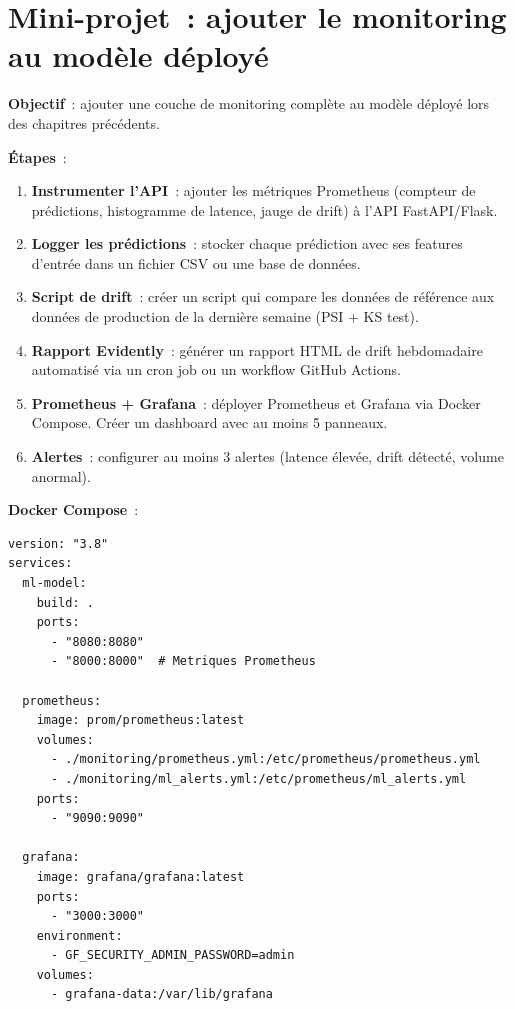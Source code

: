 \section{Mini-projet~: ajouter le monitoring au mod\`ele d\'eploy\'e}
\label{sec:monitoring-miniproject}

\begin{miniprojet}[title=\textbf{Monitoring du mod\`ele en production}]
\textbf{Objectif}~: ajouter une couche de monitoring compl\`ete au mod\`ele d\'eploy\'e lors des chapitres pr\'ec\'edents.

\textbf{\'Etapes}~:
\begin{enumerate}
    \item \textbf{Instrumenter l'API}~: ajouter les m\'etriques Prometheus (compteur de pr\'edictions, histogramme de latence, jauge de drift) \`a l'API FastAPI/Flask.
    \item \textbf{Logger les pr\'edictions}~: stocker chaque pr\'ediction avec ses features d'entr\'ee dans un fichier CSV ou une base de donn\'ees.
    \item \textbf{Script de drift}~: cr\'eer un script qui compare les donn\'ees de r\'ef\'erence aux donn\'ees de production de la derni\`ere semaine (PSI + KS test).
    \item \textbf{Rapport Evidently}~: g\'en\'erer un rapport HTML de drift hebdomadaire automatis\'e via un cron job ou un workflow GitHub Actions.
    \item \textbf{Prometheus + Grafana}~: d\'eployer Prometheus et Grafana via Docker Compose. Cr\'eer un dashboard avec au moins 5 panneaux.
    \item \textbf{Alertes}~: configurer au moins 3 alertes (latence \'elev\'ee, drift d\'etect\'e, volume anormal).
\end{enumerate}

\textbf{Docker Compose}~:
\begin{verbatim}
version: "3.8"
services:
  ml-model:
    build: .
    ports:
      - "8080:8080"
      - "8000:8000"  # Metriques Prometheus

  prometheus:
    image: prom/prometheus:latest
    volumes:
      - ./monitoring/prometheus.yml:/etc/prometheus/prometheus.yml
      - ./monitoring/ml_alerts.yml:/etc/prometheus/ml_alerts.yml
    ports:
      - "9090:9090"

  grafana:
    image: grafana/grafana:latest
    ports:
      - "3000:3000"
    environment:
      - GF_SECURITY_ADMIN_PASSWORD=admin
    volumes:
      - grafana-data:/var/lib/grafana


\end{verbatim}
\end{miniprojet}

